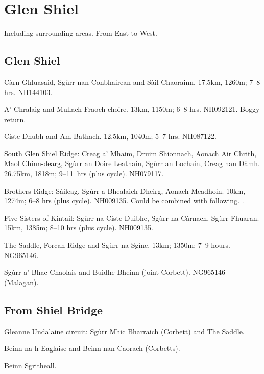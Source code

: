 \section{Glen Shiel}

Including surrounding areas.  From East to West.

\subsection{Glen Shiel}

\begin{munros}
\item
Càrn Ghluasaid, Sgùrr nan Conbhairean and Sàil Chaorainn.  17.5km, 1260m; 7--8
hrs.  NH144103.  \tick

\item
A' Chralaig and Mullach Fraoch-choire.  13km, 1150m; 6--8 hrs.  NH092121.
Boggy return. \tick

\item
Ciste Dhubh and Am Bathach.  12.5km, 1040m; 5--7 hrs. NH087122.  \tick

\item
\target  South Glen Shiel Ridge: Creag a' Mhaim, Druim Shionnach, Aonach Air
Chrith, Maol Chinn-dearg, Sgùrr an Doire Leathain, Sgùrr an Lochain, Creag nan
Dàmh.  26.75km, 1818m; 9--11~hrs (plus cycle).  NH079117.  \tick

\item
\target Brothers Ridge: Sàileag, Sgùrr a Bhealaich Dheirg, Aonach Meadhoin.
10km, 1274m; 6--8 hrs (plus cycle).  NH009135.  Could be combined with
following.  \tick.

\item
\target Five Sisters of Kintail: Sgùrr na Ciste Duibhe, Sgùrr na Càrnach,
Sgùrr Fhuaran.  15km, 1385m; 8--10 hrs (plus cycle).  NH009135.  \tick

\item \target The Saddle, Forcan Ridge and Sgùrr na Sgìne.  13km;
  1350m; 7--9 hours.  NG965146.  \tick

\item\target\target Sgùrr a' Bhac Chaolais and Buidhe Bheinn (joint Corbett).
  NG965146 (Malagan). 
\end{munros}


\subsection{From Shiel Bridge}

\begin{munros}
\item\target\target Gleanne Undalaine circuit: Sgùrr Mhic Bharraich (Corbett)
  and The Saddle.

\item\target\target Beinn na h-Eaglaise and Beinn nan Caorach (Corbetts).

\item Beinn Sgritheall.  \tick
\end{munros}

